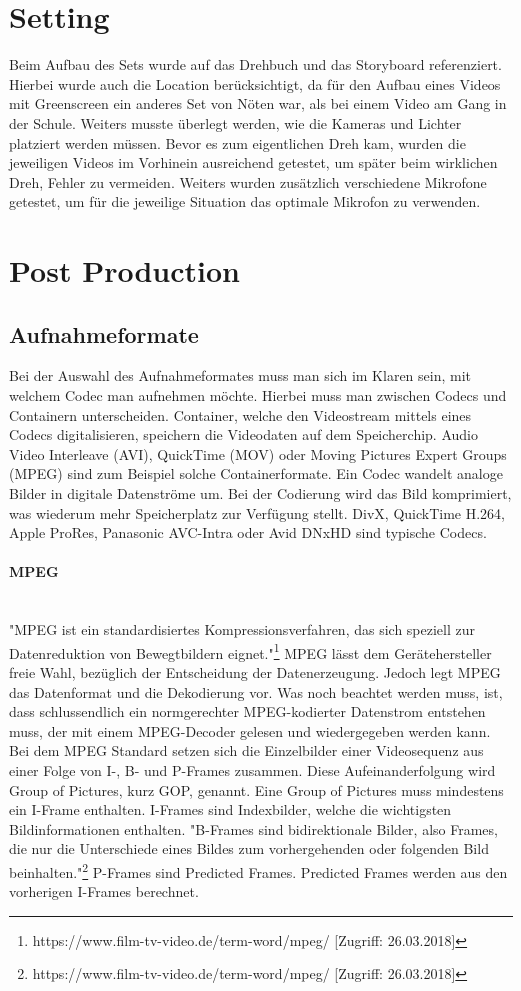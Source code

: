 \section{Setting}
Beim Aufbau des Sets wurde auf das Drehbuch und das Storyboard referenziert. Hierbei wurde auch die Location berücksichtigt, da für den Aufbau eines Videos mit Greenscreen ein anderes Set von Nöten war, als bei einem Video am Gang in der Schule. Weiters musste überlegt werden, wie die Kameras und Lichter platziert werden müssen. Bevor es zum eigentlichen Dreh kam, wurden die jeweiligen Videos im Vorhinein ausreichend getestet, um später beim wirklichen Dreh, Fehler zu vermeiden. Weiters wurden zusätzlich verschiedene Mikrofone getestet, um für die jeweilige Situation das optimale Mikrofon zu verwenden.
\section{Post Production}
\subsection{Aufnahmeformate}
Bei der Auswahl des Aufnahmeformates muss man sich im Klaren sein, mit welchem Codec man aufnehmen möchte. Hierbei muss man zwischen Codecs und Containern unterscheiden. Container, welche den Videostream mittels eines Codecs digitalisieren, speichern die Videodaten auf dem Speicherchip. Audio Video Interleave (AVI), QuickTime (MOV) oder Moving Pictures Expert Groups (MPEG) sind zum Beispiel solche Containerformate. Ein Codec wandelt analoge Bilder in digitale Datenströme um. Bei der Codierung wird das Bild komprimiert, was wiederum mehr Speicherplatz zur Verfügung stellt. DivX, QuickTime H.264, Apple ProRes, Panasonic AVC-Intra oder Avid DNxHD sind typische Codecs. 
\paragraph{MPEG}
\leavevmode \\
"MPEG ist ein standardisiertes Kompressionsverfahren, das sich speziell zur Datenreduktion von Bewegtbildern eignet."\footnote{\label{}https://www.film-tv-video.de/term-word/mpeg/ [Zugriff: 26.03.2018]} MPEG lässt dem Gerätehersteller freie Wahl, bezüglich der Entscheidung der Datenerzeugung. Jedoch legt MPEG das Datenformat und die Dekodierung vor. Was noch beachtet werden muss, ist, dass schlussendlich ein normgerechter MPEG-kodierter Datenstrom entstehen muss, der mit einem MPEG-Decoder gelesen und wiedergegeben werden kann. Bei dem MPEG Standard setzen sich die Einzelbilder einer Videosequenz aus einer Folge von I-, B- und P-Frames zusammen. Diese Aufeinanderfolgung wird Group of Pictures, kurz GOP, genannt. Eine Group of Pictures muss mindestens ein I-Frame enthalten. I-Frames sind Indexbilder, welche die wichtigsten Bildinformationen enthalten. "B-Frames sind  bidirektionale Bilder, also Frames, die nur die Unterschiede eines Bildes zum vorhergehenden oder folgenden Bild beinhalten."\footnote{\label{}https://www.film-tv-video.de/term-word/mpeg/ [Zugriff: 26.03.2018]} P-Frames sind Predicted Frames. Predicted Frames werden aus den vorherigen I-Frames berechnet.
